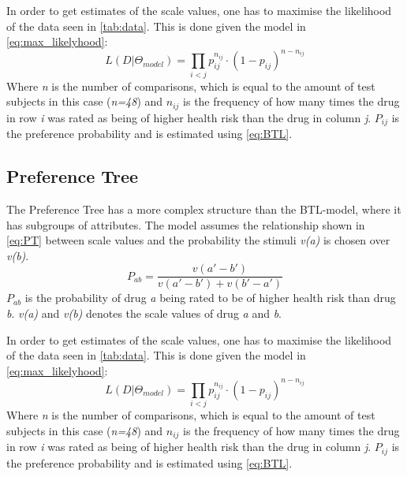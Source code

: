 In order to get estimates of the scale values, one has to maximise the likelihood of the data seen in \autoref{tab:data}. This is done given the model in \autoref{eq:max_likelyhood}: 
%
\begin{equation}
L(D|\Theta_{model}) = \prod_{i<j} p_{ij} ^{n_{ij}}\cdot(1- p_{ij})^{n-n_{ij}}
\label{eq:max_likelyhood}
\end{equation}
\noindent 
%
Where \textit{n} is the number of comparisons, which is equal to the amount of test subjects in this case (\textit{n=48}) and $n_{ij}$ is the frequency of how many times the drug in row \textit{i} was rated as being of higher health risk than the drug in column \textit{j}. $P_{ij}$ is the preference probability and is estimated using \autoref{eq:BTL}. 

\subsection*{Preference Tree}
%
The Preference Tree has a more complex structure than the BTL-model, where it has subgroups of attributes. The model assumes the relationship shown in \autoref{eq:PT} between scale values and the probability the stimuli \textit{v(a)} is chosen over \textit{v(b)}.
%
\begin{equation}
P_{ab} =\frac{v(a'-b')}{v(a'-b')+v(b'-a')} 
\label{eq:PT}
\end{equation}
\noindent
%
$P_{ab}$ is the probability of drug \textit{a} being rated to be of higher health risk than drug \textit{b}. \textit{v(a)} and \textit{v(b)} denotes the scale values of drug \textit{a} and \textit{b}.

In order to get estimates of the scale values, one has to maximise the likelihood of the data seen in \autoref{tab:data}. This is done given the model in \autoref{eq:max_likelyhood}: 
%
\begin{equation}
L(D|\Theta_{model}) = \prod_{i<j} p_{ij} ^{n_{ij}}\cdot(1- p_{ij})^{n-n_{ij}}
\label{eq:max_likelyhood}
\end{equation}
\noindent 
%
Where \textit{n} is the number of comparisons, which is equal to the amount of test subjects in this case (\textit{n=48}) and $n_{ij}$ is the frequency of how many times the drug in row \textit{i} was rated as being of higher health risk than the drug in column \textit{j}. $P_{ij}$ is the preference probability and is estimated using \autoref{eq:BTL}. 





